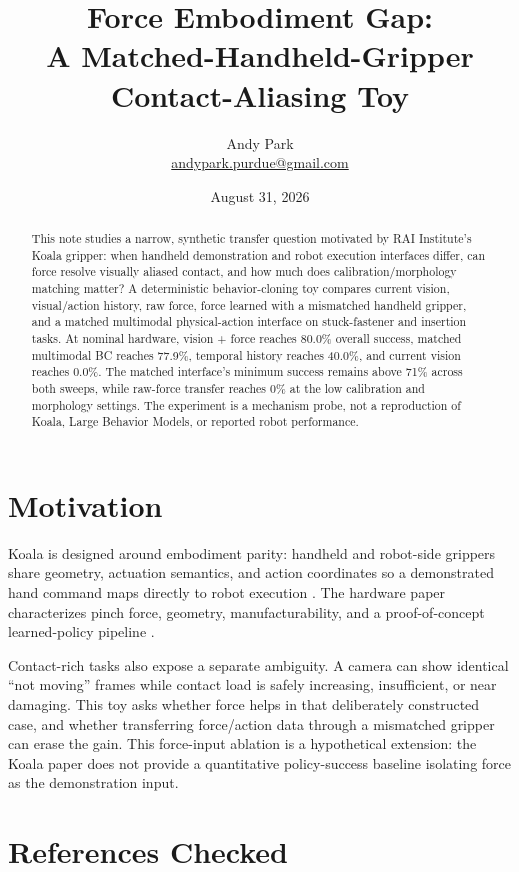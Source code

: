 \documentclass[11pt]{article}
\title{Force Embodiment Gap:\\A Matched-Handheld-Gripper Contact-Aliasing Toy}
\author{Andy Park\\\href{mailto:andypark.purdue@gmail.com}{andypark.purdue@gmail.com}}
\date{August 31, 2026}
\begin{document}
\setlength{\emergencystretch}{3em}
\maketitle

\begin{abstract}
This note studies a narrow, synthetic transfer question motivated by RAI Institute's Koala gripper: when handheld demonstration and robot execution interfaces differ, can force resolve visually aliased contact, and how much does calibration/morphology matching matter? A deterministic behavior-cloning toy compares current vision, visual/action history, raw force, force learned with a mismatched handheld gripper, and a matched multimodal physical-action interface on stuck-fastener and insertion tasks. At nominal hardware, vision + force reaches 80.0\% overall success, matched multimodal BC reaches 77.9\%, temporal history reaches 40.0\%, and current vision reaches 0.0\%. The matched interface's minimum success remains above 71\% across both sweeps, while raw-force transfer reaches 0\% at the low calibration and morphology settings. The experiment is a mechanism probe, not a reproduction of Koala, Large Behavior Models, or reported robot performance.
\end{abstract}

\section{Motivation}

Koala is designed around embodiment parity: handheld and robot-side grippers share geometry, actuation semantics, and action coordinates so a demonstrated hand command maps directly to robot execution \cite{article,koala}. The hardware paper characterizes pinch force, geometry, manufacturability, and a proof-of-concept learned-policy pipeline \cite{paper}.

Contact-rich tasks also expose a separate ambiguity. A camera can show identical ``not moving'' frames while contact load is safely increasing, insufficient, or near damaging. This toy asks whether force helps in that deliberately constructed case, and whether transferring force/action data through a mismatched gripper can erase the gain. This force-input ablation is a hypothetical extension: the Koala paper does not provide a quantitative policy-success baseline isolating force as the demonstration input.

\section{References Checked}
\end{document}
